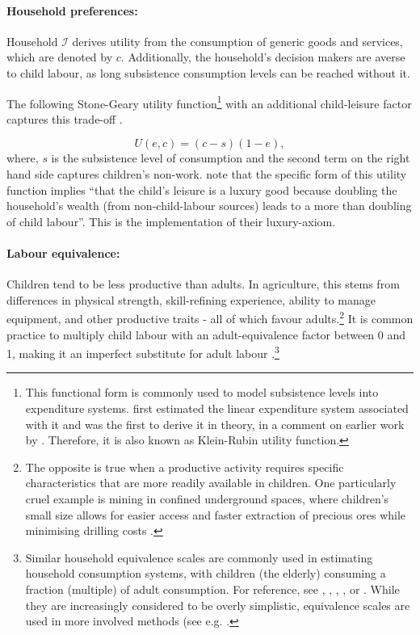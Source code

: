 \documentclass[a4paper,12pt]{article}
\theoremstyle{plain}
\theoremstyle{definition}
\theoremstyle{definition}
\theoremstyle{definition}
\theoremstyle{definition}
\begin{document}
\paragraph{Household preferences:}
\label{sec:hhpreferences}

Household $\mathcal{I}$ derives utility from the consumption of generic goods and services, which are denoted by $c$. Additionally, the household's decision makers are averse to child labour, as long subsistence consumption levels can be reached without it.

The following Stone-Geary utility function\footnote{This functional form is commonly used to model subsistence levels into expenditure systems. \citet{stone1954} first estimated the linear expenditure system associated with it and \citet{geary1950} was the first to derive it in theory, in a comment on earlier work by \citet{klein1947}. Therefore, it is also known as Klein-Rubin utility function.} with an additional child-leisure factor captures this trade-off \citep[cf.][]{Basu1998}.

\begin{equation}
\label{eq:UF}
    U(e,c)=(c-s)(1-e),
\end{equation}
where, $s$ is the subsistence level of consumption and the second term on the right hand side captures children's non-work. \citet{Basu1998} note that the specific form of this utility function implies ``that the child's leisure is a luxury good because doubling the household's wealth (from non-child-labour sources) leads to a more than doubling of child labour''. This is the implementation of their luxury-axiom.

\paragraph{Labour equivalence:} Children tend to be less productive than adults. In agriculture, this stems from differences in physical strength, skill-refining experience, ability to manage equipment, and other productive traits - all of which favour adults.\footnote{The opposite is true when a productive activity requires specific characteristics that are more readily available in children. One particularly cruel example is mining in confined underground spaces, where children's small size allows for easier access and faster extraction of precious ores while minimising drilling costs  \citep[see e.g.][]{Odriscoll2017}.} It is common practice to multiply child labour with an adult-equivalence factor between 0 and 1, making it an imperfect substitute for adult labour \citep{Basu1998, Baland2000, Bhalotra2003, Basu2010, Dwibedi2017, Dumas2020}.\footnote{Similar household equivalence scales are commonly used in estimating household consumption systems, with children (the elderly) consuming a fraction (multiple) of adult consumption. For reference, see \citet{Pollak1979}, \citet{Lewbel1989}, \citet{Blundell1994}, \citet{Lewbel1997}, or \citet{Deaton1999}. While they are increasingly considered to be overly simplistic, equivalence scales are used in more involved methods (see e.g. \citet{Dunbar2013}.}
\end{document}
